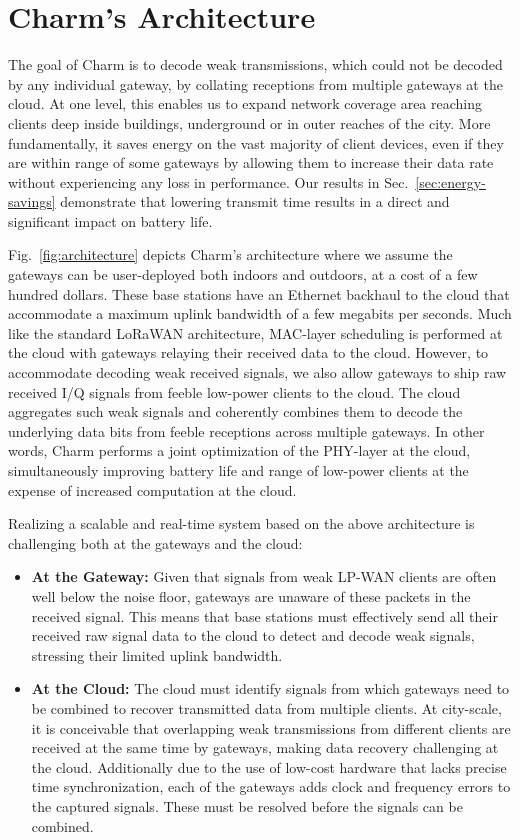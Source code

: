 \section{Charm's Architecture}
\label{sec:arch}

The goal of Charm is to decode weak transmissions, which could not be decoded
by any individual gateway, by collating receptions from multiple gateways at
the cloud. At one level, this  enables us to expand network coverage area
reaching clients deep inside buildings, underground or in outer reaches of the
city. More fundamentally, it saves energy on the vast majority of client
devices, even if they are within range of some gateways by allowing them to
increase their data rate without experiencing any loss in performance. Our
results in Sec.~\ref{sec:energy-savings} demonstrate that lowering transmit
time results in a direct and significant impact on battery life.

Fig.~\ref{fig:architecture} depicts Charm's architecture where we assume the
gateways can be user-deployed  both indoors and outdoors, at a cost of a few
hundred dollars. These base stations have an Ethernet backhaul to the cloud
that accommodate a maximum uplink bandwidth of a few megabits per seconds.
Much like the standard LoRaWAN architecture, MAC-layer scheduling is performed
at the cloud with gateways relaying their received data to the cloud. However,
to accommodate decoding weak received signals, we also allow gateways to ship
raw received I/Q signals from feeble low-power clients to the cloud. The cloud
aggregates such weak signals and coherently combines them to decode the
underlying data bits from feeble receptions across multiple gateways. In other
words, Charm performs a joint optimization of the  PHY-layer at the cloud,
simultaneously improving battery life and range of low-power clients at the
expense of increased computation at the cloud.

Realizing a scalable and real-time system based on the above architecture
is challenging both at the gateways and the cloud:
\begin{itemize}
\item {\bf At the Gateway: } Given that signals from weak LP-WAN
clients are often well below the noise floor, gateways are unaware of these
packets in the received signal. This means that base stations must effectively
send all their received raw signal data to the cloud to detect and decode weak
signals, stressing their limited uplink bandwidth.
\item {\bf At the Cloud: } The cloud must identify signals from which
gateways need to be combined to recover transmitted data from multiple
clients. At city-scale, it is conceivable that overlapping weak transmissions
from different clients are received at the same time by gateways, making data
recovery challenging at the cloud. Additionally due to the use of low-cost
hardware that lacks precise time synchronization, each of the gateways adds
clock and frequency errors to the captured signals. These must be resolved
before the signals can be combined.
\end{itemize}

